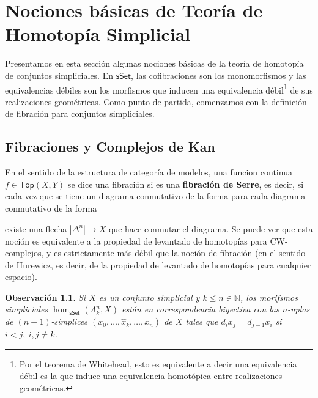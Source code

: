 \documentclass[11pt]{report}
\theoremstyle{colored}
\newtheorem{remark}{Observación}[section]
\newcommand{\N}{\mathbb{N}}
\newcommand{\cat}[1]{\mathsf{#1}}
\renewcommand{\ss}[1]{\Delta^{#1}}
\newcommand{\horn}[2]{\Lambda^{#1}_{#2}}
\begin{document}
\chapter{Nociones básicas de Teoría de Homotopía Simplicial}

Presentamos en esta sección algunas nociones básicas de la teoría de homotopía de conjuntos simpliciales. En $\cat{sSet}$, las cofibraciones son los monomorfismos y las equivalencias débiles son los morfismos que inducen una equivalencia débil\footnote{Por el teorema de Whitehead, esto es equivalente a decir una equivalencia débil es la que induce una equivalencia homotópica entre realizaciones geométricas.} de sus realizaciones geométricas. Como punto de partida, comenzamos con la definición de fibración para conjuntos simpliciales.

\section{Fibraciones y Complejos de Kan}

En el sentido de la estructura de categoría de modelos, una funcion continua $f \in \cat{Top}(X,Y)$ se dice una fibración si es una \textbf{fibración de Serre}, es decir, si cada vez que se tiene un diagrama conmutativo de la forma
para cada diagrama conmutativo de la forma
\begin{center}
\end{center}
existe una flecha $|\ss{n}| \to X$ que hace conmutar el diagrama. Se puede ver que esta noción es equivalente a la propiedad de levantado de homotopías para CW-complejos, y es estrictamente más débil que la noción de fibración (en el sentido de Hurewicz, es decir, de la propiedad de levantado de homotopías para cualquier espacio). 

\begin{remark} Si $X$ es un conjunto simplicial y $k \leq n \in \N$, los morifsmos simpliciales $\hom_{\cat{sSet}}(\horn{n}{k}, X)$ están en correspondencia biyectiva con las $n$-uplas de $(n-1)$-símplices $(x_0,\dots,\widehat{x}_k,\dots, x_n)$ de $X$ tales que $d_ix_j = d_{j-1}x_i$ si $i < j, \ i,j \neq k$. 
\end{remark}
\end{document}
